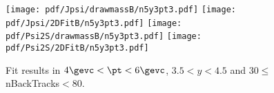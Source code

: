 \begin{figure}[H]
\begin{center}
\texttt{[image: pdf/Jpsi/drawmassB/n5y3pt3.pdf]}
\texttt{[image: pdf/Jpsi/2DFitB/n5y3pt3.pdf]}
\vspace*{-0.5cm}
\texttt{[image: pdf/Psi2S/drawmassB/n5y3pt3.pdf]}
\texttt{[image: pdf/Psi2S/2DFitB/n5y3pt3.pdf]}
\vspace*{-0.5cm}
\end{center}
\caption{Fit results in $4\gevc<\pt<6\gevc$, $3.5<y<4.5$ and 30$\leq$nBackTracks$<$80.}
\label{Fitn5y3pt3}
\end{figure}
